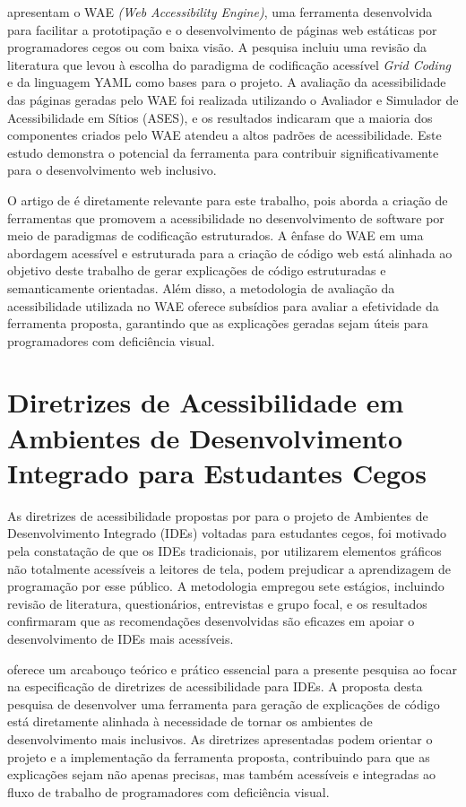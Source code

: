 \documentclass[
    12pt,                   %
    openright,              %
    oneside,                %
    a4paper,                %
    sumario=tradicional,    %
    english,                %
    brazil,                 %
    ]{abntex2}
\begin{document}
\textcite{latinoware40920} apresentam o WAE \textit{(Web Accessibility Engine)}, uma ferramenta desenvolvida para facilitar a prototipação e o desenvolvimento de páginas web estáticas por programadores cegos ou com baixa visão. A pesquisa incluiu uma revisão da literatura que levou à escolha do paradigma de codificação acessível \textit{Grid Coding} e da linguagem YAML como bases para o projeto. A avaliação da acessibilidade das páginas geradas pelo WAE foi realizada utilizando o Avaliador e Simulador de Acessibilidade em Sítios (ASES), e os resultados indicaram que a maioria dos componentes criados pelo WAE atendeu a altos padrões de acessibilidade. Este estudo demonstra o potencial da ferramenta para contribuir significativamente para o desenvolvimento web inclusivo.

O artigo de \textcite{latinoware40920} é diretamente relevante para este trabalho, pois aborda a criação de ferramentas que promovem a acessibilidade no desenvolvimento de software por meio de paradigmas de codificação estruturados. A ênfase do WAE em uma abordagem acessível e estruturada para a criação de código web está alinhada ao objetivo deste trabalho de gerar explicações de código estruturadas e semanticamente orientadas. Além disso, a metodologia de avaliação da acessibilidade utilizada no WAE oferece subsídios para avaliar a efetividade da ferramenta proposta, garantindo que as explicações geradas sejam úteis para programadores com deficiência visual.

\section{Diretrizes de Acessibilidade em Ambientes de Desenvolvimento Integrado para Estudantes Cegos}

As diretrizes de acessibilidade propostas por \textcite{latinoware37693} para o projeto de Ambientes de Desenvolvimento Integrado (IDEs) voltadas para estudantes cegos, foi motivado pela constatação de que os IDEs tradicionais, por utilizarem elementos gráficos não totalmente acessíveis a leitores de tela, podem prejudicar a aprendizagem de programação por esse público. A metodologia empregou sete estágios, incluindo revisão de literatura, questionários, entrevistas e grupo focal, e os resultados confirmaram que as recomendações desenvolvidas são eficazes em apoiar o desenvolvimento de IDEs mais acessíveis.

\textcite{latinoware37693} oferece um arcabouço teórico e prático essencial para a presente pesquisa ao focar na especificação de diretrizes de acessibilidade para IDEs. A proposta desta pesquisa de desenvolver uma ferramenta para geração de explicações de código está diretamente alinhada à necessidade de tornar os ambientes de desenvolvimento mais inclusivos. As diretrizes apresentadas podem orientar o projeto e a implementação da ferramenta proposta, contribuindo para que as explicações sejam não apenas precisas, mas também acessíveis e integradas ao fluxo de trabalho de programadores com deficiência visual.
\end{document}
